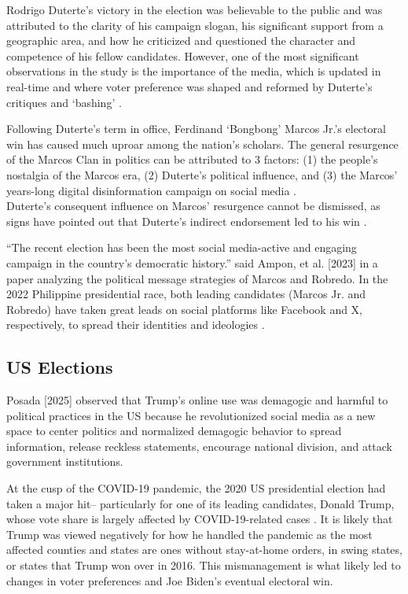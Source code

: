 Rodrigo Duterte's victory in the election was believable to the public and was attributed to the clarity of his campaign slogan, his significant support from a geographic area, and how he criticized and questioned the character and competence of his fellow candidates. However, one of the most significant observations in the study is the importance of the media, which is updated in real-time and where voter preference was shaped and reformed by Duterte’s critiques and ‘bashing’ \cite{RRL_Holmes-2016}.

Following Duterte’s term in office, Ferdinand ‘Bongbong’ Marcos Jr.’s electoral win has caused much uproar among the nation’s scholars. The general resurgence of the Marcos Clan in politics can be attributed to 3 factors: (1) the people’s nostalgia of the Marcos era, (2) Duterte’s political influence, and (3) the Marcos’ years-long digital disinformation campaign on social media \cite{RRL_Pernia-2025}.\\Duterte’s consequent influence on Marcos’ resurgence cannot be dismissed, as signs have pointed out that Duterte’s indirect endorsement led to his win \cite{RRL_Dulay-2023}.

“The recent election has been the most social media-active and engaging campaign in the country’s democratic history.” said Ampon, et al. [2023] in a paper analyzing the political message strategies of Marcos and Robredo. In the 2022 Philippine presidential race, both leading candidates (Marcos Jr. and Robredo) have taken great leads on social platforms like Facebook and X, respectively, to spread their identities and ideologies \cite{RRL_Ampon-2023}.

\subsection{US Elections}
Posada [2025] observed that Trump’s online use was demagogic and harmful to political practices in the US because he revolutionized social media as a new space to center politics and normalized demagogic behavior to spread information, release reckless statements, encourage national division, and attack government institutions.

At the cusp of the COVID-19 pandemic, the 2020 US presidential election had taken a major hit– particularly for one of its leading candidates, Donald Trump, whose vote share is largely affected by COVID-19-related cases \cite{RRL_Baccini-2021}. It is likely that Trump was viewed negatively for how he handled the pandemic as the most affected counties and states are ones without stay-at-home orders, in swing states, or states that Trump won over in 2016. This mismanagement is what likely led to changes in voter preferences and Joe Biden’s eventual electoral win.

